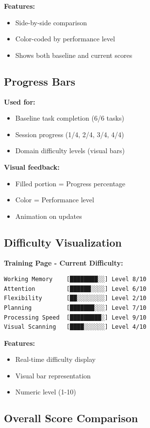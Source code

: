 \documentclass[12pt,a4paper]{article}
\begin{document}
\textbf{Features:}
\begin{itemize}
    \item Side-by-side comparison
    \item Color-coded by performance level
    \item Shows both baseline and current scores
\end{itemize}

\subsection{Progress Bars}

\textbf{Used for:}
\begin{itemize}
    \item Baseline task completion (6/6 tasks)
    \item Session progress (1/4, 2/4, 3/4, 4/4)
    \item Domain difficulty levels (visual bars)
\end{itemize}

\textbf{Visual feedback:}
\begin{itemize}
    \item Filled portion = Progress percentage
    \item Color = Performance level
    \item Animation on updates
\end{itemize}

\subsection{Difficulty Visualization}

\textbf{Training Page - Current Difficulty:}
\begin{verbatim}
Working Memory    [████████░░] Level 8/10
Attention         [██████░░░░] Level 6/10
Flexibility       [██░░░░░░░░] Level 2/10
Planning          [███████░░░] Level 7/10
Processing Speed  [█████████░] Level 9/10
Visual Scanning   [████░░░░░░] Level 4/10
\end{verbatim}

\textbf{Features:}
\begin{itemize}
    \item Real-time difficulty display
    \item Visual bar representation
    \item Numeric level (1-10)
\end{itemize}

\subsection{Overall Score Comparison}
\end{document}
